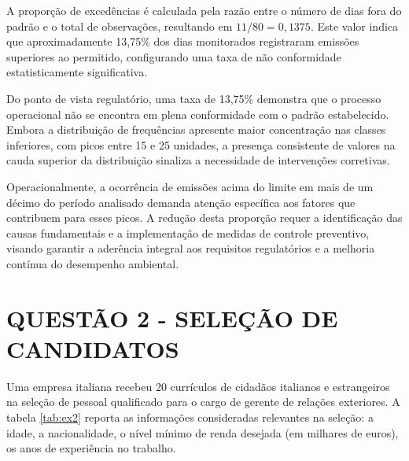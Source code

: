 \documentclass[a4paper,11pt]{article}
\begin{document}
A proporção de excedências é calculada pela razão entre o número de dias fora do padrão e o total de observações, resultando em $11/80 = 0{,}1375$. Este valor indica que aproximadamente 13,75\% dos dias monitorados registraram emissões superiores ao permitido, configurando uma taxa de não conformidade estatisticamente significativa.

Do ponto de vista regulatório, uma taxa de 13,75\% demonstra que o processo operacional não se encontra em plena conformidade com o padrão estabelecido. Embora a distribuição de frequências apresente maior concentração nas classes inferiores, com picos entre 15 e 25 unidades, a presença consistente de valores na cauda superior da distribuição sinaliza a necessidade de intervenções corretivas.

Operacionalmente, a ocorrência de emissões acima do limite em mais de um décimo do período analisado demanda atenção específica aos fatores que contribuem para esses picos. A redução desta proporção requer a identificação das causas fundamentais e a implementação de medidas de controle preventivo, visando garantir a aderência integral aos requisitos regulatórios e a melhoria contínua do desempenho ambiental.
\newpage
\section{\textbf{QUESTÃO 2 - SELEÇÃO DE CANDIDATOS}}
Uma empresa italiana recebeu 20 currículos de cidadãos italianos e estrangeiros na seleção de pessoal qualificado para o cargo de gerente de relações exteriores. A tabela \ref{tab:ex2} reporta as informações consideradas relevantes na seleção: a idade, a nacionalidade, o nível mínimo de renda desejada (em milhares de euros), os anos de experiência no trabalho.
\end{document}
